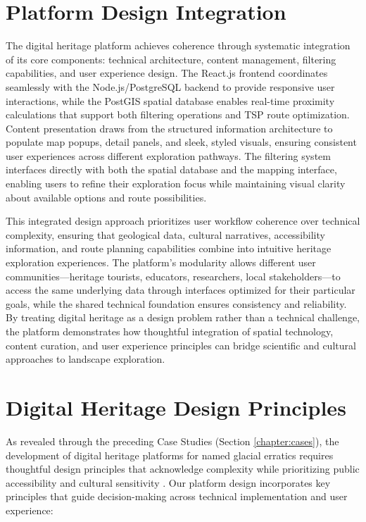 \section{Platform Design Integration}
\label{sec:integration}

The digital heritage platform achieves coherence through systematic integration of its core components: technical architecture, content management, filtering capabilities, and user experience design. The React.js frontend coordinates seamlessly with the Node.js/PostgreSQL backend to provide responsive user interactions, while the PostGIS spatial database enables real-time proximity calculations that support both filtering operations and TSP route optimization. Content presentation draws from the structured information architecture to populate map popups, detail panels, and sleek, styled visuals, ensuring consistent user experiences across different exploration pathways. The filtering system interfaces directly with both the spatial database and the mapping interface, enabling users to refine their exploration focus while maintaining visual clarity about available options and route possibilities.

This integrated design approach prioritizes user workflow coherence over technical complexity, ensuring that geological data, cultural narratives, accessibility information, and route planning capabilities combine into intuitive heritage exploration experiences. The platform's modularity allows different user communities—heritage tourists, educators, researchers, local stakeholders—to access the same underlying data through interfaces optimized for their particular goals, while the shared technical foundation ensures consistency and reliability. By treating digital heritage as a design problem rather than a technical challenge, the platform demonstrates how thoughtful integration of spatial technology, content curation, and user experience principles can bridge scientific and cultural approaches to landscape exploration.

\section{Digital Heritage Design Principles}
\label{sec:design_principles}

As revealed through the preceding Case Studies (Section \ref{chapter:cases}), the development of digital heritage platforms for named glacial erratics requires thoughtful design principles that acknowledge complexity while prioritizing public accessibility and cultural sensitivity \cite{Gregory2013}. Our platform design incorporates key principles that guide decision-making across technical implementation and user experience:


